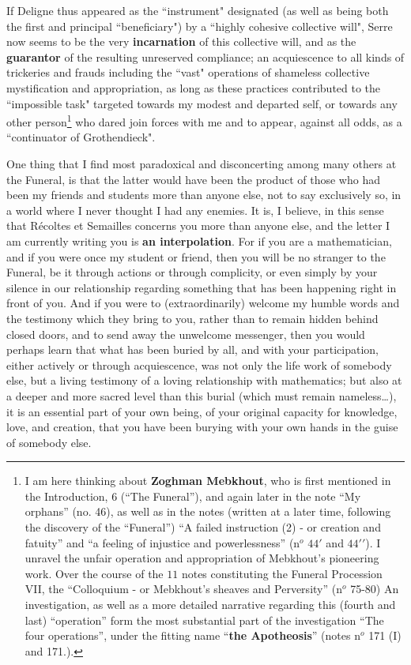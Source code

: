 If Deligne thus appeared as the ``instrument" designated (as well as being both the first
and principal ``beneficiary") by a ``highly cohesive collective will", Serre now seems to
be the very \textbf{incarnation} of this collective will, and as the \textbf{guarantor} of
the resulting unreserved compliance; an acquiescence to all kinds of trickeries and frauds
including the ``vast" operations of shameless collective mystification and appropriation,
as long as these practices contributed to the ``impossible task" targeted towards my
modest and departed self, or towards any other person\footnote{I am here thinking about
\textbf{Zoghman Mebkhout}, who is first mentioned in the Introduction, 6 (``The
Funeral''), and again later in the note ``My orphans'' (no. 46), as well as in the notes
(written at a later time, following the discovery of the ``Funeral'') ``A failed
instruction (2) - or creation and fatuity'' and ``a feeling of injustice and powerlessness''
(n$^o$ $44'$ and ${44'}'$). 
I unravel the unfair operation and appropriation of Mebkhout's pioneering work.
Over the course of the $11$ notes constituting the Funeral
Procession VII, the ``Colloquium - or Mebkhout's sheaves and Perversity''
(n$^o$ 75-80)
An investigation, as well as a more detailed narrative regarding this 
(fourth and last) ``operation'' form the most substantial part of the investigation
``The four operations'', under the fitting name ``\textbf{the Apotheosis}'' (notes n$^o$
171 (I) and 171.).} who dared join forces with me and to appear, against all odds, as a ``continuator of Grothendieck".

One thing that I find most paradoxical and disconcerting among many others at the Funeral,
is that the latter would have been the product of those who had been my friends and
students more than anyone else, not to say exclusively so, in a world where I never
thought I had any enemies.
It is, I believe, in this sense that 
R\'ecoltes et Semailles
concerns you more than anyone else, and the letter I am currently writing you is
\textbf{an interpolation}.
For if you are a mathematician, and if you were once my student or friend, 
then you will be no stranger to the Funeral, be it through actions or through complicity,
or even simply by your silence in our relationship regarding something that has been
happening right in front of you. 
And if you were to (extraordinarily) welcome my humble words and the testimony which they
bring to you, rather than to remain hidden behind closed doors, and to send away the
unwelcome messenger, then you would perhaps learn that what has been buried by all, and
with your participation, either actively or through acquiescence, was not only the life
work of somebody else, but 
a living testimony of a loving relationship with mathematics; but also at a deeper and
more sacred level than this burial (which must remain nameless\ldots), it is an essential
part of your own being, of your original capacity for knowledge, love, and creation, that
you have been burying with your own hands in the guise of somebody else. 

